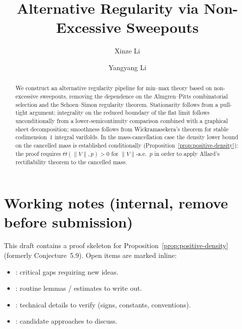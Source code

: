 \documentclass[11pt,reqno]{amsart}
\title[Alternative Regularity via Non-Excessive Sweepouts]{Alternative Regularity via Non-Excessive Sweepouts}
\author{Xinze Li}
\author{Yangyang Li}
\begin{document}
\begin{abstract}
We construct an alternative regularity pipeline for min--max theory based on
non-excessive sweepouts, removing the dependence on the Almgren--Pitts
combinatorial selection and the Schoen--Simon regularity theorem. Stationarity
follows from a pull-tight argument; integrality on the reduced boundary of the
flat limit follows unconditionally from a lower-semicontinuity comparison
combined with a graphical sheet decomposition; smoothness follows from
Wickramasekera's theorem for stable codimension~$1$ integral varifolds. In the
mass-cancellation case the density lower bound on the cancelled mass is
established conditionally (Proposition~\ref{prop:positive-density}): the proof
requires $\Theta(\|V\|, p) > 0$ for $\|V\|$-a.e.\ $p$ in order to apply
Allard's rectifiability theorem to the cancelled mass.
\end{abstract}

\maketitle

\section*{Working notes (internal, remove before submission)}

This draft contains a proof skeleton for Proposition~\ref{prop:positive-density} (formerly Conjecture~5.9). Open items are marked inline:
\begin{itemize}
    \item {}: critical gaps requiring new ideas.
    \item {}: routine lemmas / estimates to write out.
    \item {}: technical details to verify (signs, constants, conventions).
    \item {}: candidate approaches to discuss.
\end{itemize}








%



\end{document}
